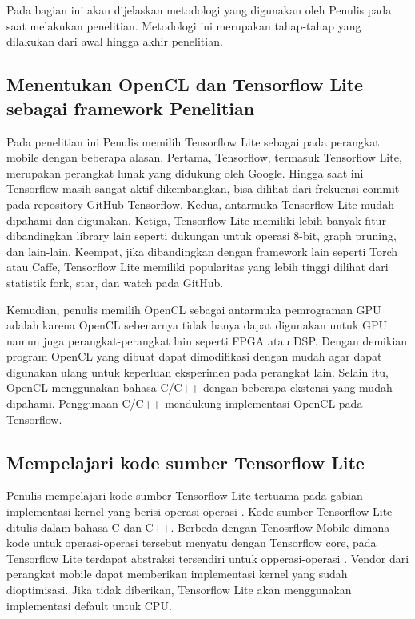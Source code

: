 \chapter{\babTiga}
Pada bagian ini akan dijelaskan metodologi yang digunakan oleh Penulis pada saat melakukan penelitian. Metodologi ini merupakan tahap-tahap yang dilakukan dari awal hingga akhir penelitian.

\section{Menentukan OpenCL dan Tensorflow Lite sebagai framework Penelitian}
Pada penelitian ini Penulis memilih Tensorflow Lite sebagai \framework \deeplearning pada perangkat mobile dengan beberapa alasan. Pertama, Tensorflow, termasuk Tensorflow Lite, merupakan perangkat lunak yang didukung oleh Google. Hingga saat ini Tensorflow masih sangat aktif dikembangkan, bisa dilihat dari frekuensi commit pada repository GitHub Tensorflow. 
Kedua, antarmuka Tensorflow Lite mudah dipahami dan digunakan.
Ketiga, Tensorflow Lite memiliki lebih banyak fitur dibandingkan library lain seperti dukungan untuk operasi 8-bit, graph pruning, dan lain-lain.
Keempat, jika dibandingkan dengan framework lain seperti Torch atau Caffe, Tensorflow Lite memiliki popularitas yang lebih tinggi dilihat dari statistik fork, star, dan watch pada GitHub.

Kemudian, penulis memilih OpenCL sebagai antarmuka pemrograman GPU adalah karena OpenCL sebenarnya tidak hanya dapat digunakan untuk GPU namun juga perangkat-perangkat lain seperti FPGA atau DSP. Dengan demikian program OpenCL yang dibuat dapat dimodifikasi dengan mudah agar dapat digunakan ulang untuk keperluan eksperimen pada perangkat lain. Selain itu, OpenCL menggunakan bahasa C/C++ dengan beberapa ekstensi yang mudah dipahami. Penggunaan C/C++ mendukung implementasi OpenCL pada Tensorflow.

\section{Mempelajari kode sumber Tensorflow Lite}
Penulis mempelajari kode sumber Tensorflow Lite tertuama pada gabian implementasi kernel yang berisi operasi-operasi \deeplearning \inference. Kode sumber Tensorflow Lite ditulis dalam bahasa C dan C++. Berbeda dengan Tenosrflow Mobile dimana kode untuk operasi-operasi tersebut menyatu dengan Tensorflow core, pada Tensorflow Lite terdapat abstraksi tersendiri untuk opperasi-operasi \deeplearning \inference. Vendor dari perangkat mobile dapat memberikan implementasi kernel \deeplearning \inference yang sudah dioptimisasi. Jika tidak diberikan, Tensorflow Lite akan menggunakan implementasi default untuk CPU.

